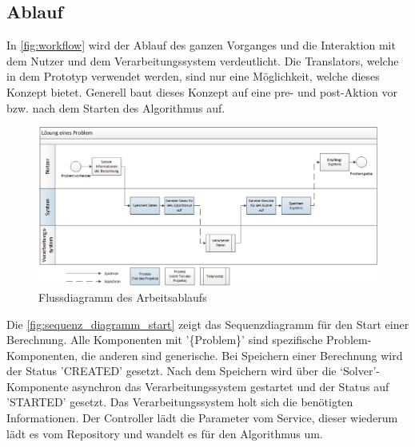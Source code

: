 \begin{landscape}
\newpage
\subsection{Ablauf}
\thispagestyle{empty}
In \autoref{fig:workflow} wird der Ablauf des ganzen Vorganges und die Interaktion mit dem Nutzer und dem Verarbeitungssystem verdeutlicht. Die Translators, welche in dem 
Prototyp verwendet werden, sind nur eine Möglichkeit, welche dieses Konzept bietet. Generell baut dieses Konzept auf eine pre- und post-Aktion vor bzw. nach dem Starten des Algorithmus 
auf.

\begin{figure}[h]
\centering
\includegraphics[scale=0.78]{images/visio/workflow_landscape.png}
\caption[Flussdiagramm des Arbeitsablaufs]{Flussdiagramm des Arbeitsablaufs \selfmade{}}
\label{fig:workflow}
\end{figure}

\end{landscape}

Die \autoref{fig:sequenz_diagramm_start} zeigt das Sequenzdiagramm für den Start einer Berechnung. Alle Komponenten mit '\{Problem\}' sind spezifische Problem-Komponenten, 
die anderen sind generische. Bei Speichern einer Berechnung wird der Status 'CREATED' gesetzt. Nach dem Speichern wird über die `Solver'-Komponente asynchron das Verarbeitungssystem 
gestartet und der Status auf 'STARTED' gesetzt. Das Verarbeitungssystem holt sich die benötigten Informationen. Der Controller lädt die Parameter vom Service, dieser wiederum lädt es vom 
Repository und wandelt es für den Algorithmus um.

